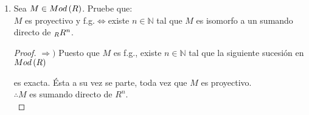 \documentclass{article}
\begin{document}
\begin{enumerate}[label=\textbf{Ej \arabic*.}]
\begin{proof}
\begin{proof}
			\end{proof}
			Ahora, sean $\coprod\limits_{i\in I}M_i$ el coproducto para $\arbtfam{M}{i}{I}$ cuyos elementos son $i$-adas de soporte finito,  una sucesión exacta en $Mod\lrprth{R}$ y, para cada $i\in I$, $F_i:=\functhom{M_i}{}{R}$ funtor covariante definido como en el Ej. 60. Por el Ej. 62 $d)$ $\forall\ i\in I$ se tiene que
			\begin{center}
			\end{center} es una sucesión exacta en $Mod\lrprth{\mathbb{Z}}$ y así, por el Lema 1,
			\begin{center}
			\end{center}
			es una sucesión exacta. Se tiene que
			\begin{align*}
				\prod\limits_{i\in I}F_i\lrprth{X}&=\prod\limits_{i\in I}\functhom{M_i}{X}{R}\\ &\simeq\functhom{\coprod\limits_{i\in I}M_i}{X}{R}.  && \text{Ej. 32}
				\intertext{Similarmente se encuentra que}
				\prod\limits_{i\in I}F_i\lrprth{Y} &\simeq\functhom{\coprod\limits_{i\in I}M_i}{Y}{R},\\
				\prod\limits_{i\in I}F_i\lrprth{Z} &\simeq\functhom{\coprod\limits_{i\in I}M_i}{Z}{R}.
			\end{align*}
			Con lo cual, por el Lema 2, 
			\begin{center}
			\end{center}
			es una sucesión exacta y así, nuevamente por el Ej. 62 $d)$, $\coprod\limits_{i\in I} M_i$ es un módulo proyectivo. Finalmente como $C\simeq\coprod\limits_{i\in I}M_i$ en $Mod(R)$, por el Lema 3, se sigue que $C$ es proyectivo y así se tiene lo deseado.\\
		\end{proof}
		\item Sea $M \in Mod\left(R\right)$. Pruebe que:\\
		$M$ es proyectivo y f.g.$\Leftrightarrow$existe $n\in\mathbb{N}$ tal que $M$ es isomorfo a un sumando directo de $\ringmod{R}{R^{n}}{l}$.
		\begin{proof}
			$\boxed{\Rightarrow )}$ Puesto que $M$ es f.g., existe $n\in\mathbb{N}$ tal que la siguiente sucesión en $Mod\lrprth{R}$
			es exacta. Ésta a su vez se parte, toda vez que $M$ es proyectivo.\\
			$\therefore M$ es sumando directo de $R^{n}$.\\
			

\end{proof}
\end{enumerate}
\end{document}
